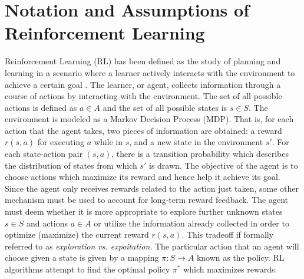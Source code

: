 \documentclass{article} %
\begin{document}
\section{Notation and Assumptions of Reinforcement Learning}

Reinforcement Learning (RL) has been defined as the study of planning and learning in a scenario where a learner actively interacts with the environment to achieve a certain goal \cite{mohri}. The learner, or agent, collects information through a course of actions by interacting with the environment.  The set of all possible actions is defined as $a \in A$ and the set of all possible states is $s \in S$. The environment is modeled as a Markov Decision Process (MDP).  That is, for each action that the agent takes, two pieces of information are obtained: a reward $r(s,a)$ for executing $a$ while in $s$, and a new state in the environment $s'$.  For each state-action pair $(s,a)$, there is a transition probability which describes the distribution of states from which $s'$ is drawn.  The objective of the agent is to choose actions which maximize its reward and hence help it achieve its goal.  Since the agent only receives rewards related to the action just taken, some other mechanism must be used to account for long-term reward feedback.
The agent must deem whether it is more appropriate to explore further unknown states $s \in S$ and actions $a \in A$ or utilize the information already collected in order to optimize (maximize) the current reward $r(s,a)$. This tradeoff if formally referred to as \textit{exploration vs. expoitation}. The particular action that an agent will choose given a state is given by a mapping $\pi : S \rightarrow A$ known as the policy. RL algorithms attempt to find the optimal policy $\pi^*$ which maximizes rewards.
\end{document}
